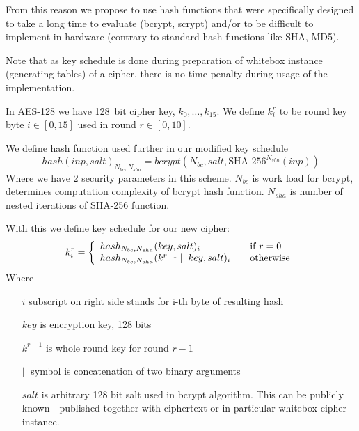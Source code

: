 \documentclass[11pt,oneside,final]{fithesis2}
\begin{document}
    From this reason we propose to use hash functions that were specifically designed to take a long time to evaluate (bcrypt, scrypt) 
    and/or to be difficult to implement in hardware (contrary to standard hash functions like SHA, MD5).

    Note that as key schedule is done during preparation of whitebox instance (generating tables) of a cipher, there is no time penalty during 
    usage of the implementation.
        
    In AES-128 we have 128~bit cipher key, $k_0,\dots,k_{15}$. We define $k_i^r$ to be round key byte $i \in [0,15]$ used in round $r \in [0,10]$.
    
    We define hash function used further in our modified key schedule
    \begin{equation}
	hash\left(inp, salt\right)_{N_{bc}, N_{sha}} = bcrypt\left(N_{bc}, salt, \text{SHA-}256^{N_{sha}}\left(inp\right)\right)
    \end{equation}
    Where we have 2 security parameters in this scheme.
    $N_{bc}$ is work load for bcrypt, determines computation complexity of bcrypt hash function. $N_{sha}$ is number of nested iterations of SHA-256 function. 
    
    With this we define key schedule for our new cipher:
    \begin{equation}\label{eq:keySchedule}
    k_i^r = \left\{ 
    \begin{array}{l l} 
	hash_{N_{bc}, N_{sha}}(key, salt)_i                   & \quad \text{if $r=0$}\\
	hash_{N_{bc}, N_{sha}}(k^{r-1} \; || \;  key, salt)_i & \quad \text{otherwise}
    \end{array} \right.
    \end{equation}
    Where
    \begin{itemize}
     \item[$i$] subscript on right side stands for i-th byte of resulting hash
     \item[$key$] is encryption key, 128 bits
     \item[$k^{r-1}$] is whole round key for round $r-1$
     \item[$||$] symbol is concatenation of two binary arguments
     \item[$salt$] is arbitrary 128 bit salt used in bcrypt algorithm. This can be publicly known - published together with ciphertext or 
	in particular whitebox cipher instance.
    \end{itemize}
\end{document}
